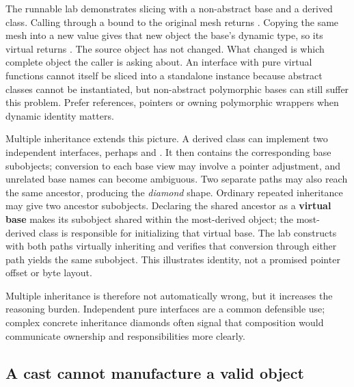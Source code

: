 The runnable lab demonstrates slicing with a non-abstract  base and a  derived class. Calling  through a  bound to the original mesh returns . Copying the same mesh into a new  value gives that new object the base's dynamic type, so its virtual  returns . The source object has not changed. What changed is which complete object the caller is asking about. An interface with pure virtual functions cannot itself be sliced into a standalone instance because abstract classes cannot be instantiated, but non-abstract polymorphic bases can still suffer this problem. Prefer references, pointers or owning polymorphic wrappers when dynamic identity matters.

Multiple inheritance extends this picture. A derived class can implement two independent interfaces, perhaps  and . It then contains the corresponding base subobjects; conversion to each base view may involve a pointer adjustment, and unrelated base names can become ambiguous. Two separate paths may also reach the same ancestor, producing the \emph{diamond} shape. Ordinary repeated inheritance may give two ancestor subobjects. Declaring the shared ancestor as a \textbf{virtual base} makes its subobject shared within the most-derived object; the most-derived class is responsible for initializing that virtual base. The lab constructs  with both paths virtually inheriting  and verifies that conversion through either path yields the same  subobject. This illustrates identity, not a promised pointer offset or byte layout.

Multiple inheritance is therefore not automatically wrong, but it increases the reasoning burden. Independent pure interfaces are a common defensible use; complex concrete inheritance diamonds often signal that composition would communicate ownership and responsibilities more clearly.

\subsection{A cast cannot manufacture a valid object}\label{01-foundations-i-ch004-a-cast-cannot-manufacture-a-valid-object}

\hypertarget{01-foundations-i-ch004-a-cast-cannot-manufacture-a-valid-object}{}

